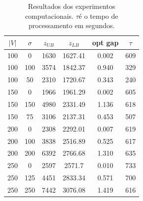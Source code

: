 \documentclass{article}
\newcommand{\abs}[1]{\ensuremath{\left| #1 \right|}}
\newcommand{\vertices}{\ensuremath{V}}
\newcommand{\nvertices}{\ensuremath{\abs{\vertices}}}
\newcommand{\similarity}{\ensuremath{\sigma}}
\newcommand{\lowerbound}{\ensuremath{z_{LB}}}
\newcommand{\upperbound}{\ensuremath{z_{UB}}}
\newcommand{\runningtime}{\ensuremath{\tau}}
\begin{document}
\begin{table}[h]
    \label{tab:res}
    \centering
    \begin{tabular}{|c|c|c|c|c|c|}
        \hline
        \nvertices & \similarity & \upperbound & \lowerbound & opt gap & \runningtime \\\hline\hline
            100 & 0   & 1630 & 1627.41 & 0.002 & 609\\\hline
            100 & 100 & 3574 & 1842.37 & 0.940 & 329\\\hline
            100 & 50  & 2310 & 1720.67 & 0.343 & 240\\\hline
            150 & 0   & 1966 & 1961.29 & 0.002 & 605\\\hline
            150 & 150 & 4980 & 2331.49 & 1.136 & 618\\\hline
            150 & 75  & 3106 & 2137.31 & 0.453 & 507\\\hline
            200 & 0   & 2308 & 2292.01 & 0.007 & 619\\\hline
            200 & 100 & 3838 & 2516.89 & 0.525 & 617\\\hline
            200 & 200 & 6392 & 2766.68 & 1.310 & 635\\\hline
            250 & 0   & 2597 & 2571.7 & 0.010 & 733\\\hline
            250 & 125 & 4451 & 2833.34 & 0.571 & 700\\\hline
            250 & 250 & 7442 & 3076.08 & 1.419 & 616\\\hline
    \end{tabular}
    \caption{Resultados dos experimentos computacionais. \runningtime é o tempo de processamento em segundos.}
    \label{tab:results}
\end{table}





\end{document}
